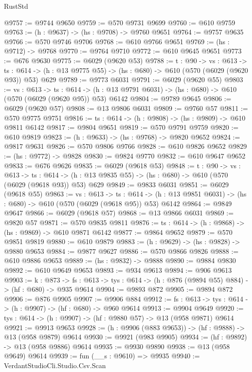 \begin{lexlean}{RustStd}
\begin{coremodule}
@9757 := @9744 @9650
@9759 := @570 @9731 @9699
@9760 := @610 @9759
@9763 := (h : @9637) -> (hs : @9708) -> @9760 @9651
@9764 := @9757 @9635
@9766 := @570 @9746 @9706
@9768 := @610 @9766 @9651
@9769 := (hs : @9712) -> @9768
@9770 := @9764 @9710
@9772 := @610 @9645 @9651
@9773 := @676 @9630
@9775 := @6029 (@9620 @53)
@9788 := {t : @90} ->
  {vs : @613} ->
  {ts : @614} -> (h : @13 @9775 @55) -> (hs : @680) -> @610 (@570 (@6029 (@9620 @93)) @53) @629
@9789 := @9773 @6031
@9791 := @6029 (@9620 @55)
@9803 := {vs : @613} ->
  {ts : @614} -> (h : @13 @9791 @6031) -> (hs : @680) -> @610 (@570 (@6029 (@9620 @95)) @53) @6142
@9804 := @9789 @9645
@9806 := @6029 (@9620 @57)
@9808 := @13 @9806 @6031
@9809 := @9760 @57
@9811 := @570 @9775 @9751
@9816 := {ts : @614} -> (h : @9808) -> (hs : @9809) -> @610 @9811 @6142
@9817 := @9804 @9651
@9819 := @570 @9791 @9759
@9820 := @610 @9819
@9823 := (h : @9633) -> (hs : @9768) -> @9820 @9652
@9824 := @9817 @9631
@9826 := @570 @9806 @9766
@9828 := @610 @9826 @9652
@9829 := (hs : @9772) -> @9828
@9830 := @9824 @9770
@9832 := @610 @9647 @9652
@9833 := @676 @9626
@9835 := @6029 (@9618 @53)
@9848 := {t : @90} ->
  {vs : @613} ->
  {ts : @614} -> (h : @13 @9835 @55) -> (hs : @680) -> @610 (@570 (@6029 (@9618 @93)) @53) @629
@9849 := @9833 @6031
@9851 := @6029 (@9618 @55)
@9863 := {vs : @613} ->
  {ts : @614} -> (h : @13 @9851 @6031) -> (hs : @680) -> @610 (@570 (@6029 (@9618 @95)) @53) @6142
@9864 := @9849 @9647
@9866 := @6029 (@9618 @57)
@9868 := @13 @9866 @6031
@9869 := @9820 @57
@9871 := @570 @9835 @9811
@9876 := {ts : @614} -> (h : @9868) -> (hs : @9869) -> @610 @9871 @6142
@9877 := @9864 @9652
@9879 := @570 @9851 @9819
@9880 := @610 @9879
@9883 := (h : @9629) -> (hs : @9828) -> @9880 @9653
@9884 := @9877 @9627
@9886 := @570 @9866 @9826
@9888 := @610 @9886 @9653
@9889 := (hs : @9832) -> @9888
@9890 := @9884 @9830
@9892 := @610 @9649 @9653
@9893 := @934 @9613
@9894 := @906 @9613
@9903 := {k : @873} ->
  {fs : @613} -> {tys : @614} -> (h : @876 (@9894 @55) @884) -> (hf : @680) -> @935 @9614
@9904 := @9893 @872
@9905 := @9894 @872
@9906 := @876 @9905
@9907 := @9906 @884
@9912 := {fs : @613} -> {tys : @614} -> (h : @9907) -> (hf : @680) -> @960 @9614
@9913 := @9904 @9649
@9920 := {tys : @614} -> (h : @9907) -> (hf : @9880 @57) -> @13 (@958 @9871) @9614
@9921 := @9913 @9653
@9928 := (h : @9906 (@883 @9653)) -> (hf : @9888) -> @13 (@958 @9879) @9614
@9930 := @9921 (@983 @9905)
@9934 := (hf : @9892) -> @13 (@958 @9886) @9614
@9935 := @9930 @9890
@9938 := @13 (@958 @9649) @9614
@9939 := fun (__s : @9610) => @9935
@9940 := VerdantStudioCli.Studio.Csv.Scan

\end{coremodule}
\end{lexlean}
